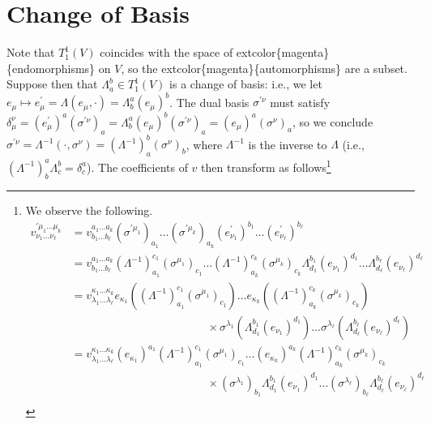\documentclass[
]{book}
\begin{document}
\hypertarget{change-of-basis}{%
\section{Change of Basis}\label{change-of-basis}}

Note that \(T_1^1(V)\) coincides with the space of extcolor\{magenta\}\{endomorphisms\} on \(V\), so the extcolor\{magenta\}\{automorphisms\} are a subset. Suppose then that \(\Lambda_a^b \in T_1^1(V)\) is a change of basis: i.e., we let \(e_\mu \mapsto e_\mu^\prime = \Lambda(e_\mu, \cdot) = \Lambda_b^a (e_\mu)^b\). The dual basis \(\sigma^{\prime\nu}\) must satisfy \(\delta_\mu^\nu = (e^\prime_\mu)^a (\sigma^{\prime \nu})_a = \Lambda_b^a (e_\mu)^b (\sigma^{\prime \nu})_a = (e_\mu)^a(\sigma^{\nu})_a\), so we conclude \(\sigma^{\prime\nu} = \Lambda^{-1}(\cdot, \sigma^\nu) = (\Lambda^{-1})_a^b (\sigma^\nu)_b\), where \(\Lambda^{-1}\) is the inverse to \(\Lambda\) (i.e., \((\Lambda^{-1})^a_b \Lambda^b_c = \delta^a_c\)). The coefficients of \(v\) then transform as follows\footnote{We observe the following.
  \begin{align*}
  v_{\nu_1\dots \nu_\ell}^{\prime \mu_1\dots \mu_k} &= v_{b_1\dots b_\ell}^{a_1\dots a_k}(\sigma^{\prime\mu_1})_{a_1}\dots(\sigma^{\prime\mu_k})_{a_k} (e^\prime_{\nu_1})^{b_1} \dots (e^\prime_{\nu_\ell})^{b_\ell}\\
  &= v_{b_1\dots b_\ell}^{a_1\dots a_k} (\Lambda^{-1})_{a_1}^{c_1}(\sigma^{\mu_1})_{c_1}\dots(\Lambda^{-1})_{a_k}^{c_k}(\sigma^{\mu_k})_{c_k} \Lambda_{d_1}^{b_1}(e_{\nu_1})^{d_1} \dots \Lambda_{d_\ell}^{b_\ell}(e_{\nu_\ell})^{d_\ell}\\
  &= v_{\lambda_1\dots \lambda_\ell}^{\kappa_1\dots \kappa_k} e_{\kappa_1}((\Lambda^{-1})_{a_1}^{c_1}(\sigma^{\mu_1})_{c_1})\dots e_{\kappa_k}((\Lambda^{-1})_{a_k}^{c_k}(\sigma^{\mu_k})_{c_k}) \\
  &\qquad\qquad\qquad\qquad\qquad\qquad \times \sigma^{\lambda_1}(\Lambda_{d_1}^{b_1}(e_{\nu_1})^{d_1}) \dots \sigma^{\lambda_\ell}(\Lambda_{d_\ell}^{b_\ell}(e_{\nu_\ell})^{d_\ell})\\
  &= v_{\lambda_1\dots \lambda_\ell}^{\kappa_1\dots \kappa_k} (e_{\kappa_1})^{a_1}(\Lambda^{-1})_{a_1}^{c_1}(\sigma^{\mu_1})_{c_1}\dots (e_{\kappa_k})^{a_k}(\Lambda^{-1})_{a_k}^{c_k}(\sigma^{\mu_k})_{c_k} \\
  &\qquad\qquad\qquad\qquad\qquad\qquad \times (\sigma^{\lambda_1})_{b_1}\Lambda_{d_1}^{b_1}(e_{\nu_1})^{d_1} \dots (\sigma^{\lambda_\ell})_{b_\ell}\Lambda_{d_\ell}^{b_\ell}(e_{\nu_\ell})^{d_\ell}\\

\end{align*}}
\end{document}
